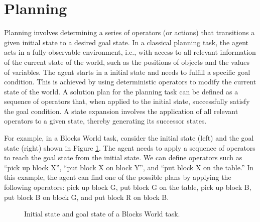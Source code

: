 \documentclass[ppgc,diss,english]{iiufrgs}
\begin{document}
\section{Planning}
\label{sec:intro-planning}
Planning involves determining a series of operators (or actions) that transitions a given initial state to a desired goal state.
In a classical planning task, the agent acts in a fully-observable environment, i.e., with access to all relevant information of the current state of the world, such as the positions of objects and the values of variables. The agent starts in a initial state and needs to fulfill a specific goal condition. This is achieved by using deterministic operators to modify the current state of the world. A solution plan for the planning task can be defined as a sequence of operators that, when applied to the initial state, successfully satisfy the goal condition. A state expansion involves the application of all relevant operators to a given state, thereby generating its successor states.

For example, in a Blocks World task, consider the initial state (left) and the goal state (right) shown in Figure \ref{fig:intro-blocks}. The agent needs to apply a sequence of operators to reach the goal state from the initial state. We can define operators such as ``pick up block X'', ``put block X on block Y'', and ``put block X on the table.'' In this example, the agent can find one of the possible plans by applying the following operators: pick up block G, put block G on the table, pick up block B, put block B on block G, and put block R on block B. %

\begin{figure}[ht]
\caption[Initial state of a Blocks World task]{Initial state and goal state of a Blocks World task.}
\vspace{\baselineskip}
\centering
{}
\label{fig:intro-blocks}
\end{figure}
\end{document}
